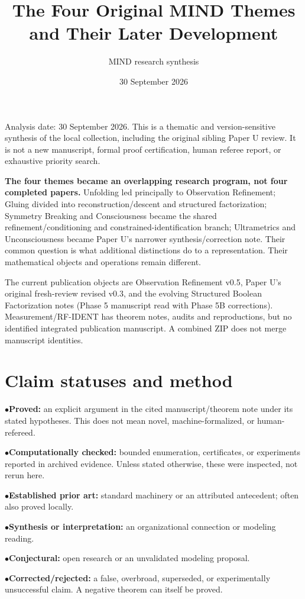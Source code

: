 \documentclass[10pt,letterpaper]{article}
\title{The Four Original MIND Themes and Their Later Development}
\author{MIND research synthesis}
\date{30 September 2026}
\begin{document}
\maketitle


Analysis date: 30 September 2026. This is a thematic and version-sensitive synthesis of the local collection, including the original sibling Paper U review. It is not a new manuscript, formal proof certification, human referee report, or exhaustive priority search.\par

\textbf{The four themes became an overlapping research program, not four completed papers.} Unfolding led principally to Observation Refinement; Gluing divided into reconstruction/descent and structured factorization; Symmetry Breaking and Consciousness became the shared refinement/conditioning and constrained-identification branch; Ultrametrics and Unconsciousness became Paper U's narrower synthesis/correction note. Their common question is what additional distinctions do to a representation. Their mathematical objects and operations remain different.\par

The current publication objects are Observation Refinement v0.5, Paper U's original fresh-review revised v0.3, and the evolving Structured Boolean Factorization notes (Phase 5 manuscript read with Phase 5B corrections). Measurement/RF-IDENT has theorem notes, audits and reproductions, but no identified integrated publication manuscript. A combined ZIP does not merge manuscript identities.\par

\section*{Claim statuses and method}

\noindent$\bullet$\quad \textbf{Proved:} an explicit argument in the cited manuscript/theorem note under its stated hypotheses. This does not mean novel, machine-formalized, or human-refereed.\par
\noindent$\bullet$\quad \textbf{Computationally checked:} bounded enumeration, certificates, or experiments reported in archived evidence. Unless stated otherwise, these were inspected, not rerun here.\par
\noindent$\bullet$\quad \textbf{Established prior art:} standard machinery or an attributed antecedent; often also proved locally.\par
\noindent$\bullet$\quad \textbf{Synthesis or interpretation:} an organizational connection or modeling reading.\par
\noindent$\bullet$\quad \textbf{Conjectural:} open research or an unvalidated modeling proposal.\par
\noindent$\bullet$\quad \textbf{Corrected/rejected:} a false, overbroad, superseded, or experimentally unsuccessful claim. A negative theorem can itself be proved.\par
\end{document}
